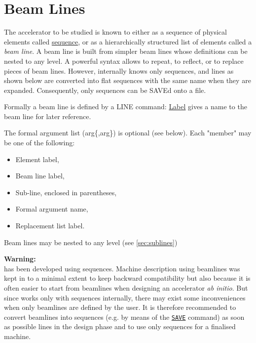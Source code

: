 

\chapter{Beam Lines}
\label{chap:beamlines}

The accelerator to be studied is known to \madx either as a sequence of
physical elements called \hyperref[chap:sequence]{sequence}, or as a
hierarchically structured list of elements called a \emph{beam line}. 
A beam line is built from simpler beam lines whose definitions can be
nested to any level. A powerful syntax allows to repeat, to reflect, or
to replace pieces of beam lines. However, internally \madx knows only
sequences, and lines as shown below are converted into flat sequences
with the same name when they are expanded. Consequently, only sequences
can be SAVEd onto a file.

Formally a beam line is defined by a LINE command: 
\hyperref[sec:label]{Label} gives a name to the beam line for later reference. 

The formal argument list (arg\{,arg\}) is optional (see below). Each
"member" may be one of the following:  
\begin{itemize}
\item  Element label, 
\item  Beam line label, 
\item  Sub-line, enclosed in parentheses, 
\item  Formal argument name, 
\item  Replacement list label. 
\end{itemize} 

Beam lines may be nested to any level (see \ref{sec:sublines})  


\textbf{Warning:}\\
\madx has been developed using sequences. Machine description using
beamlines was kept in \madx to a minimal extent to keep backward 
compatibility but also because it is often easier to start from beamlines 
when designing an accelerator \textsl{ab initio}.
But since \madx works only with sequences internally, there may exist
some inconveniences when only beamlines are defined by the user. It is
therefore recommended to convert beamlines into sequences (e.g. by means
of the \hyperref[sec:save]{\texttt{SAVE}} command) as soon as possible
lines in the design phase and to use only sequences for a finalised
machine.      

